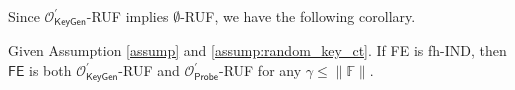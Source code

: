 Since $\mathcal{O}^\prime_{\textsf{KeyGen}}$-RUF implies $\emptyset$-RUF, we have the following corollary.

\begin{corollary}
\label{cor:fh-IPFE:ind-OKeyGen-OEnc-ruf}
Given Assumption \ref{assump} and \ref{assump:random_key_ct}. If \textsf{FE} is fh-IND, then $\textsf{FE}$ is both $\mathcal{O}^\prime_{\textsf{KeyGen}}$-RUF and $\mathcal{O}^\prime_{\textsf{Probe}}$-RUF for any $\gamma \leq \|\mathbb{F}\|$.
\end{corollary}



% 

\pagebreak

\nocite{*}
\printbibliography



